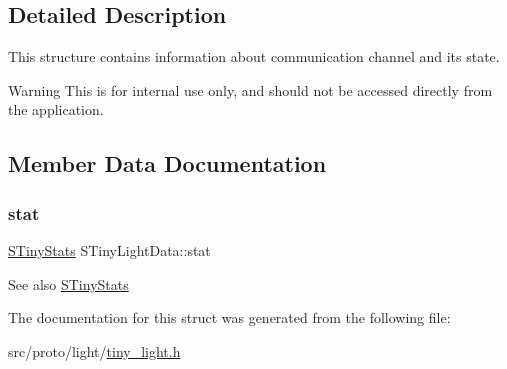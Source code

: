 \subsection{Detailed Description}
This structure contains information about communication channel and its state. \begin{DoxyWarning}{Warning}
This is for internal use only, and should not be accessed directly from the application. 
\end{DoxyWarning}


\subsection{Member Data Documentation}
\mbox{\label{structSTinyLightData_a623323a7a84807b5ce14a7cb56ec07f0}} 
\subsubsection{\texorpdfstring{stat}{stat}}
{\footnotesize\ttfamily \hyperlink{structSTinyStats}{S\+Tiny\+Stats} S\+Tiny\+Light\+Data\+::stat}

\begin{DoxySeeAlso}{See also}
\hyperlink{structSTinyStats}{S\+Tiny\+Stats} 
\end{DoxySeeAlso}


The documentation for this struct was generated from the following file\+:\begin{DoxyCompactItemize}
\item 
src/proto/light/\hyperlink{tiny__light_8h}{tiny\+\_\+light.\+h}\end{DoxyCompactItemize}
